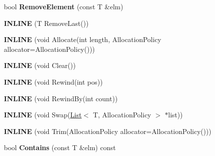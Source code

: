 \begin{DoxyCompactItemize}
\item 
bool {\bfseries Remove\+Element} (const T \&elm)\hypertarget{classv8_1_1internal_1_1_list_a301b954cd7954452fca522c542f2d69a}{}\label{classv8_1_1internal_1_1_list_a301b954cd7954452fca522c542f2d69a}

\item 
{\bfseries I\+N\+L\+I\+NE} (T Remove\+Last())\hypertarget{classv8_1_1internal_1_1_list_a7dd35dbbdfc6f0b4a0dae4a8dd38e1be}{}\label{classv8_1_1internal_1_1_list_a7dd35dbbdfc6f0b4a0dae4a8dd38e1be}

\item 
{\bfseries I\+N\+L\+I\+NE} (void Allocate(int length,                                                                                   Allocation\+Policy allocator=Allocation\+Policy()))\hypertarget{classv8_1_1internal_1_1_list_ae84744968dd71016625de4883ad9ece8}{}\label{classv8_1_1internal_1_1_list_ae84744968dd71016625de4883ad9ece8}

\item 
{\bfseries I\+N\+L\+I\+NE} (void Clear())\hypertarget{classv8_1_1internal_1_1_list_a775bd901890c7b639652620ddd9dcafc}{}\label{classv8_1_1internal_1_1_list_a775bd901890c7b639652620ddd9dcafc}

\item 
{\bfseries I\+N\+L\+I\+NE} (void Rewind(int pos))\hypertarget{classv8_1_1internal_1_1_list_a79c274928631e75ec2568f51141721bd}{}\label{classv8_1_1internal_1_1_list_a79c274928631e75ec2568f51141721bd}

\item 
{\bfseries I\+N\+L\+I\+NE} (void Rewind\+By(int count))\hypertarget{classv8_1_1internal_1_1_list_a3f3d1e9d330bef9aeff65bc4a0fa5f89}{}\label{classv8_1_1internal_1_1_list_a3f3d1e9d330bef9aeff65bc4a0fa5f89}

\item 
{\bfseries I\+N\+L\+I\+NE} (void Swap(\hyperlink{classv8_1_1internal_1_1_list}{List}$<$ T, Allocation\+Policy $>$ $\ast$list))\hypertarget{classv8_1_1internal_1_1_list_a0a72d8984b3ff72d1a8fd11301c52908}{}\label{classv8_1_1internal_1_1_list_a0a72d8984b3ff72d1a8fd11301c52908}

\item 
{\bfseries I\+N\+L\+I\+NE} (void Trim(Allocation\+Policy allocator=Allocation\+Policy()))\hypertarget{classv8_1_1internal_1_1_list_ac424eb47de7ac71f1707ab9c4e41fd48}{}\label{classv8_1_1internal_1_1_list_ac424eb47de7ac71f1707ab9c4e41fd48}

\item 
bool {\bfseries Contains} (const T \&elm) const \hypertarget{classv8_1_1internal_1_1_list_a268fad971190fd4ff7669b06bfe5118e}{}\label{classv8_1_1internal_1_1_list_a268fad971190fd4ff7669b06bfe5118e}


\end{DoxyCompactItemize}
